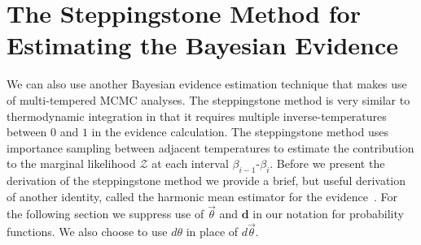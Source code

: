 \section{The Steppingstone Method for Estimating the Bayesian Evidence}\label{sec:ssa}
We can also use another Bayesian evidence estimation technique that makes use of multi-tempered MCMC analyses. The steppingstone method is very similar to thermodynamic integration in that it requires multiple inverse-temperatures between $0$ and $1$ in the evidence calculation. The steppingstone method uses importance sampling between adjacent temperatures to estimate the contribution to the marginal likelihood $\mathcal{Z}$ at each interval $\beta_{i-1}$-$\beta_i$. Before we present the derivation of the steppingstone method we provide a brief, but useful derivation of another identity, called the harmonic mean estimator for the evidence~\citep{newton1994approximate}. For the following section we suppress use of $\vec{\theta}$ and $\mathbf{d}$ in our notation for probability functions. We also choose to use $d\theta$ in place of $d\vec{\theta}$.

